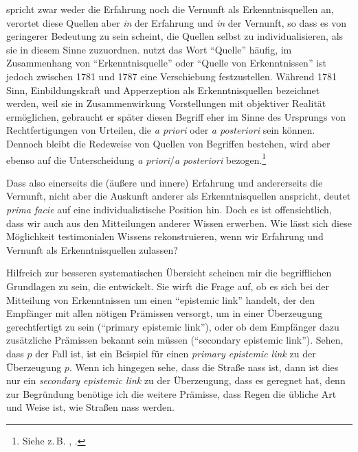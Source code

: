 spricht zwar weder die Erfahrung noch die Vernunft als Erkenntnisquellen an,
verortet diese Quellen aber \emph{in} der Erfahrung und \emph{in} der Vernunft,
so dass es von geringerer Bedeutung zu sein scheint, die Quellen selbst zu
individualisieren, als sie in diesem Sinne zuzuordnen. 
nutzt das Wort \enquote{Quelle} häufig, im Zusammenhang von
\enquote{Erkenntnisquelle} oder \enquote{Quelle von Erkenntnissen} ist jedoch
zwischen 1781 und 1787 eine Verschiebung festzustellen. Während 1781 Sinn,
Einbildungskraft und Apperzeption als Erkenntnisquellen bezeichnet werden, weil
sie in Zusammenwirkung Vorstellungen mit objektiver Realität ermöglichen,
gebraucht er später diesen Begriff eher im Sinne des Ursprungs von
Rechtfertigungen von Urteilen, die \emph{a priori} oder \emph{a posteriori} sein
können. Dennoch bleibt die Redeweise von Quellen von Begriffen bestehen, wird
aber ebenso auf die Unterscheidung \emph{a priori}/\emph{a posteriori}
bezogen.\footnote{Siehe z.\,B. \cite[][B 57]{Kant:KritikderreinenVernunft2003},
\cite[][III: 63.37--64.2]{Kant:GesammelteWerke1900ff.}.}

Dass  also einerseits die (äußere und innere) Erfahrung
und andererseits die Vernunft, nicht aber die Auskunft anderer als
Erkenntnisquellen anspricht, deutet \emph{prima facie} auf eine
individualistische Position hin. Doch es ist offensichtlich, dass wir auch aus
den Mitteilungen anderer Wissen erwerben. Wie lässt sich diese Möglichkeit
testimonialen Wissens rekonstruieren, wenn wir Erfahrung und Vernunft als
Erkenntnisquellen zulassen?

Hilfreich zur besseren systematischen Übersicht scheinen mir die begrifflichen
Grundlagen zu sein, die 
entwickelt. Sie wirft die Frage auf, ob es sich bei der Mitteilung von
Erkenntnissen um einen \enquote{epistemic link} handelt, der den Empfänger mit allen nötigen Prämissen versorgt, um in
einer Überzeugung gerechtfertigt zu sein (\enquote{primary epistemic link}), oder
ob dem Empfänger dazu zusätzliche Prämissen bekannt sein müssen
(\enquote{secondary epistemic link}). Sehen, dass
$p$ der Fall ist, ist ein Beispiel für einen \emph{primary epistemic link} zu
der Überzeugung $p$. Wenn ich hingegen sehe, dass die Straße nass ist, dann ist
dies nur ein \emph{secondary epistemic link} zu der Überzeugung, dass es
geregnet hat, denn zur Begründung benötige ich die weitere Prämisse, dass Regen
die übliche Art und Weise ist, wie Straßen nass werden.

